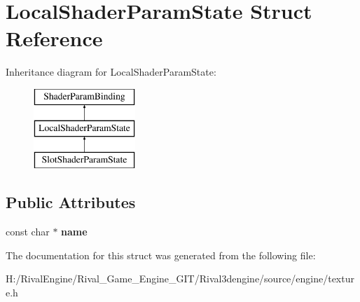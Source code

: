 \hypertarget{struct_local_shader_param_state}{}\section{Local\+Shader\+Param\+State Struct Reference}
\label{struct_local_shader_param_state}
Inheritance diagram for Local\+Shader\+Param\+State\+:\begin{figure}[H]
\begin{center}
\leavevmode
\includegraphics[height=3.000000cm]{struct_local_shader_param_state}
\end{center}
\end{figure}
\subsection*{Public Attributes}
\begin{DoxyCompactItemize}
\item 
\mbox{\label{struct_local_shader_param_state_ab6219366a1ff34d8f9cfc0ba36e2ebac}} 
const char $\ast$ {\bfseries name}
\end{DoxyCompactItemize}


The documentation for this struct was generated from the following file\+:\begin{DoxyCompactItemize}
\item 
H\+:/\+Rival\+Engine/\+Rival\+\_\+\+Game\+\_\+\+Engine\+\_\+\+G\+I\+T/\+Rival3dengine/source/engine/texture.\+h\end{DoxyCompactItemize}
